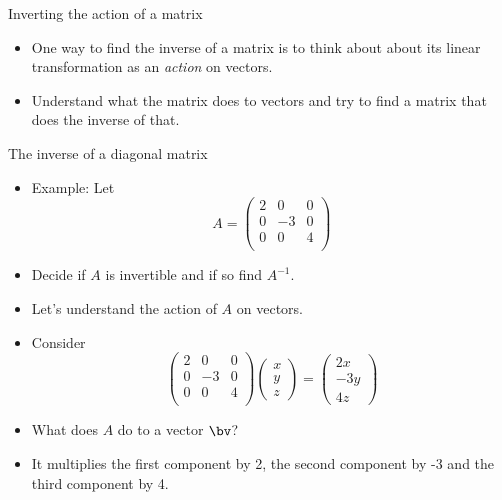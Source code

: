\documentclass{beamer}
\begin{document}
\begin{frame}{Inverting the action of a matrix}

\begin{itemize}
\item One way to find the inverse of a matrix is to think about
about its linear transformation as an \emph{action} on vectors.
\item Understand what the matrix does to vectors and try to find
a matrix that does the inverse of that.
\end{itemize}
\end{frame}

\begin{frame}{The inverse of a diagonal matrix}

\begin{itemize}
\item Example: Let
$$
A =
\begin{pmatrix}
2 & 0 & 0 \\
0 & -3 & 0 \\
0 & 0 & 4 \\
\end{pmatrix}
$$
\item Decide if $A$ is invertible and if so find $A^{-1}$.
\item Let's understand the action of $A$ on vectors.
\item Consider
$$
\begin{pmatrix}
2 & 0 & 0 \\
0 & -3 & 0 \\
0 & 0 & 4 \\
\end{pmatrix}
\begin{pmatrix}
x \\ y \\ z
\end{pmatrix}
=
\begin{pmatrix}
2x \\ -3y \\ 4z
\end{pmatrix}
$$
\item What does $A$ do to a vector $\bv$?
\item It multiplies the first component by 2, the second component by -3
and the third component by 4.
\end{itemize}
\end{frame}
\end{document}
